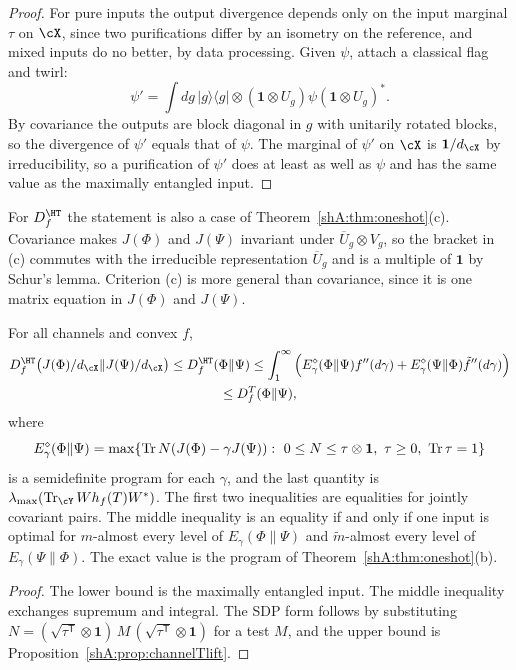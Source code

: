 \begin{proof}
For pure inputs the output divergence depends only on the input marginal $\tau$ on $\cX$, since two purifications differ by an isometry on the reference, and mixed inputs do no better, by data processing. Given $\psi$, attach a classical flag and twirl:
\[
\psi'=\int dg\,|g\rangle\langle g|\otimes(\mathbf 1\otimes U_g)\psi(\mathbf 1\otimes U_g)^*.
\]
By covariance the outputs are block diagonal in $g$ with unitarily rotated blocks, so the divergence of $\psi'$ equals that of $\psi$. The marginal of $\psi'$ on $\cX$ is $\mathbf 1/d_\cX$ by irreducibility, so a purification of $\psi'$ does at least as well as $\psi$ and has the same value as the maximally entangled input.
\end{proof}

For $D^\HT_f$ the statement is also a case of Theorem~\ref{shA:thm:oneshot}(c). Covariance makes $J(\Phi)$ and $J(\Psi)$ invariant under $\overline U_g\otimes V_g$, so the bracket in (c) commutes with the irreducible representation $\overline U_g$ and is a multiple of $\mathbf 1$ by Schur's lemma. Criterion (c) is more general than covariance, since it is one matrix equation in $J(\Phi)$ and $J(\Psi)$.

\begin{proposition}\label{shA:prop:channelbounds}
For all channels and convex $f$,
\begin{multline*}
D^\HT_f\big(J(\Phi)/d_\cX\|J(\Psi)/d_\cX\big)\le D^\HT_f(\Phi\|\Psi)\le\int_1^\infty\Big(E^\diamond_\gamma(\Phi\|\Psi)f''(d\gamma)+E^\diamond_\gamma(\Psi\|\Phi)\tilde f''(d\gamma)\Big)\\
\le D^T_f(\Phi\|\Psi),
\end{multline*}
where
\[
E^\diamond_\gamma(\Phi\|\Psi)=\max\{\Tr N(J(\Phi)-\gamma J(\Psi)):\ 0\le N\le\tau\otimes\mathbf 1,\ \tau\ge0,\ \Tr\tau=1\}
\]
is a semidefinite program for each $\gamma$, and the last quantity is $\lambda_{\max}(\Tr_\cY Wh_f(T)W^*)$. The first two inequalities are equalities for jointly covariant pairs. The middle inequality is an equality if and only if one input is optimal for $m$-almost every level of $E_\gamma(\Phi\|\Psi)$ and $\tilde m$-almost every level of $E_\gamma(\Psi\|\Phi)$. The exact value is the program of Theorem~\ref{shA:thm:oneshot}(b).
\end{proposition}

\begin{proof}
The lower bound is the maximally entangled input. The middle inequality exchanges supremum and integral. The SDP form follows by substituting $N=(\sqrt{\tau^{\mathsf T}}\otimes\mathbf 1)\,M\,(\sqrt{\tau^{\mathsf T}}\otimes\mathbf 1)$ for a test $M$, and the upper bound is Proposition~\ref{shA:prop:channelTlift}.
\end{proof}

